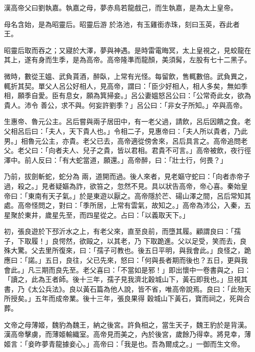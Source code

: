 \begin{pinyinscope}
 漢高帝父曰劉執嘉。執嘉之母，夢赤鳥若龍戲己，而生執嘉，是為太上皇帝。



 母名含始，是為昭靈后。昭靈后游
 於洛池，有玉雞銜赤珠，刻曰玉英，吞此者王。



 昭靈后取而吞之；又寢於大澤，夢與神遇。是時雷電晦冥，太上皇視之，見蛟龍在其上，遂有身而生季，是為高帝。高帝隆準而龍顏，美須髯，左股有七十二黑子。



 微時，數從王媼、武負貰酒，醉臥，上常有光怪。每留飲，售輒數倍。武負異之，輒折其契。單父人呂公好相人，見高帝，謂曰：「臣少好相人，相人多矣，無如季相，願季自愛。臣有息女，願為箕掃妾。」呂公妻媼怒呂公曰：「公常奇此女，欲為貴人。沛令
 善公，求不與。何妄許劉季？」呂公曰：「非女子所知。」卒與高帝。



 生惠帝、魯元公主。呂后嘗與兩子居田中，有一老父過，請飲，呂后因饋之食。老父相呂后曰：「夫人，天下貴人也。」令相二子，見惠帝曰：「夫人所以貴者，乃此男。」相魯元公主，亦貴。老父已去，高帝適從傍舍來，呂后具言之。高帝追問老父。老父曰：「向者夫人、兒子之貴，皆以君相。君貴不可言。」高帝被飲，夜行徑澤中。前人反曰：「有大蛇當道，願還。」高帝醉，曰：「壯士行，何畏？」



 乃前，拔劍斬蛇，蛇分為
 兩，道開而過。後人來者，見老嫗守蛇曰：「向者赤帝子過，殺之。」見者疑嫗為詐，欲笞之，忽然不見。具以狀告高帝，帝心喜。秦始皇帝曰：「東南有天子氣。」於是東遊以厭之。高帝隱於芒、碭山澤之間，呂后常知其處。高帝怪問之，對曰：「季所居，上常有雲氣，故知之。」高帝為沛公，入秦，五星聚於東井，歲星先至，而四星從之。占曰：「以義取天下。」



 初，張良遊於下邳沂水之上，有老父來，直至良前，而墮其履。顧謂良曰：「孺子，下取履！」良愕然，欲毆之，以其老，乃
 下取跪進。父以足受，笑而去，良殊大驚。父去里所復來，曰：「孺子可教也。後五日平明，與我會此。」良怪之，跪應曰：「諾。」五日，良往，父已先來，怒曰：「何與長者期而後也？五日，更與我會此。」凡三期而良先至。老父喜曰：「不當如是邪！」即出懷中一卷書與之，曰：「讀之，此為王者師。後十三年，孺子見我濟北穀城山下，黃石即我也。」旦視其書，乃《太公兵法》。良以黃石篇為他人說，皆不省，唯高帝說焉。良曰：「此殆天所授矣。」五年而成帝業。後十三年，張良果得
 穀城山下黃石，寶而祠之，死與合葬。



 文帝之母薄姬，魏豹為魏王，納之後宮。許負相之，當生天子，魏王豹於是背漢。漢高帝擊虜，而薄姬輸織室。高帝見而美之，內於後宮，歲餘乃得幸。將見幸，薄姬言：「妾昨夢青龍據妾心。」高帝曰：「我是也。吾為爾成之。」一御而生文帝。




\end{pinyinscope}
